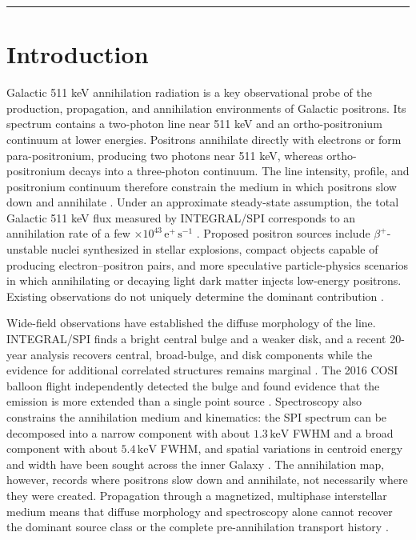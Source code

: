 \documentclass[11pt]{article}
\newcommand{\keV}{\ensuremath{\,\mathrm{keV}}}
\begin{document}
\vspace{0.3em}
\noindent\rule{\textwidth}{0.4pt}
\vspace{1.0em}

\section{Introduction}
\label{sec:introduction}

Galactic 511 keV annihilation radiation is a key observational probe of the
production, propagation, and annihilation environments of Galactic positrons.
Its spectrum contains a two-photon line near 511 keV and an ortho-positronium
continuum at lower energies. Positrons annihilate directly with electrons or
form para-positronium, producing two photons near 511 keV, whereas
ortho-positronium decays into a three-photon continuum. The line intensity,
profile, and positronium continuum therefore constrain the medium in which
positrons slow down and annihilate \cite{Prantzos2011,Jean2006}. Under an
approximate steady-state assumption, the total Galactic 511 keV flux measured
by INTEGRAL/SPI corresponds to an annihilation rate of a few
$\times10^{43}\,\mathrm{e^+\,s^{-1}}$ \cite{Prantzos2011,Kierans2020}. Proposed
positron sources include $\beta^+$-unstable nuclei synthesized in stellar
explosions, compact objects capable of producing electron--positron pairs, and
more speculative particle-physics scenarios in which annihilating or decaying
light dark matter injects low-energy positrons. Existing observations do not
uniquely determine the dominant contribution
\cite{Prantzos2011,Siegert2016AA,Siegert2016V404}.

Wide-field observations have established the diffuse morphology of the line.
INTEGRAL/SPI finds a bright central bulge and a weaker disk, and a recent
20-year analysis recovers central, broad-bulge, and disk components while the
evidence for additional correlated structures remains marginal
\cite{Knodlseder2005AllSky,Siegert2016AA,Yoneda2025}. The 2016 COSI balloon flight independently
detected the bulge and found evidence that the emission is more extended than a
single point source \cite{Kierans2020,Siegert2020COSI}. Spectroscopy also
constrains the annihilation medium and kinematics: the SPI spectrum can be
decomposed into a narrow component with about $1.3\keV$ FWHM and a broad
component with about $5.4\keV$ FWHM, and spatial variations in centroid energy
and width have been sought across the inner Galaxy
\cite{Jean2006,Siegert2019Kinematics}. The annihilation map, however, records
where positrons slow down and annihilate, not necessarily where they were
created. Propagation through a magnetized, multiphase interstellar medium means
that diffuse morphology and spectroscopy alone cannot recover the dominant
source class or the complete pre-annihilation transport history
\cite{Prantzos2011}.
\end{document}
